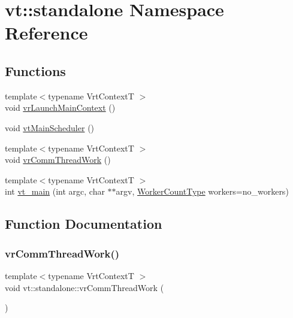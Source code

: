 \hypertarget{namespacevt_1_1standalone}{}\section{vt\+:\+:standalone Namespace Reference}
\label{namespacevt_1_1standalone}
\subsection*{Functions}
\begin{DoxyCompactItemize}
\item 
{\footnotesize template$<$typename Vrt\+ContextT $>$ }\\void \hyperlink{namespacevt_1_1standalone_a670dc96651da265f465fbe0536555430}{vr\+Launch\+Main\+Context} ()
\item 
void \hyperlink{namespacevt_1_1standalone_a381ccc8b6c5dde4e852b5b012c525ba1}{vt\+Main\+Scheduler} ()
\item 
{\footnotesize template$<$typename Vrt\+ContextT $>$ }\\void \hyperlink{namespacevt_1_1standalone_af76367e5e8324e34b2bc335f54178c19}{vr\+Comm\+Thread\+Work} ()
\item 
{\footnotesize template$<$typename Vrt\+ContextT $>$ }\\int \hyperlink{namespacevt_1_1standalone_a21572ffe25ef856833affb178fde4c66}{vt\+\_\+main} (int argc, char $\ast$$\ast$argv, \hyperlink{namespacevt_aa93398ea48f2cb6c188512250f7cc248}{Worker\+Count\+Type} workers=no\+\_\+workers)
\end{DoxyCompactItemize}


\subsection{Function Documentation}
\mbox{\label{namespacevt_1_1standalone_af76367e5e8324e34b2bc335f54178c19}} 
\subsubsection{\texorpdfstring{vr\+Comm\+Thread\+Work()}{vrCommThreadWork()}}
{\footnotesize\ttfamily template$<$typename Vrt\+ContextT $>$ \\
void vt\+::standalone\+::vr\+Comm\+Thread\+Work (\begin{DoxyParamCaption}{ }\end{DoxyParamCaption})\hspace{0.3cm}{\ttfamily [inline]}}

